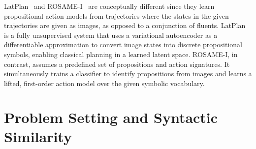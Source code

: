 \documentclass{article}
\theoremstyle{definition}
\theoremstyle{remark}
\newif\ifaddcomments
\newcommand{\roni}[1]{\ifaddcomments{\textcolor{red}{[Roni: #1]}}\fi}
\newcommand{\mauro}[1]{\ifaddcomments{\textcolor{green}{[Mauro: #1]}}\fi}
\newcommand{\yarin}[1]{\ifaddcomments{\textcolor{teal}{[Yarin: #1]}}\fi}
\begin{document}
LatPlan~\citep{asai2018classical} and ROSAME-I~\citep{xi2024neuro} are conceptually different since they learn propositional action models from trajectories where the states in the given trajectories are given as images, as opposed to a conjunction of fluents. 
LatPlan is a fully unsupervised system that uses a variational autoencoder as a differentiable approximation to convert image states into discrete propositional symbols, enabling classical planning in a learned latent space.
ROSAME-I, in contrast, assumes a predefined set of propositions and action signatures. It simultaneously trains a classifier to identify propositions from images and learns a lifted, first-order action model over the given symbolic vocabulary.




\roni{To all: do not worry about shortening the background section. I will do this later.}

\section{Problem Setting and Syntactic Similarity}
\label{sec:problem-setting}

\end{document}
